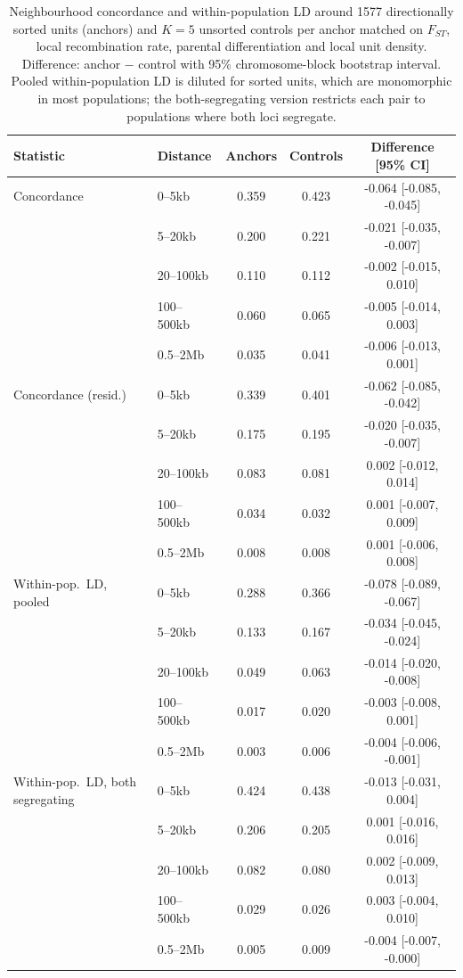 \begin{table}[htbp]
\centering
\small
\caption{Neighbourhood concordance and within-population LD around 1577 directionally sorted units (anchors) and $K=5$ unsorted controls per anchor matched on $F_{ST}$, local recombination rate, parental differentiation and local unit density. Difference: anchor $-$ control with 95\% chromosome-block bootstrap interval. Pooled within-population LD is diluted for sorted units, which are monomorphic in most populations; the both-segregating version restricts each pair to populations where both loci segregate.}
\label{tab:anchors}
\begin{tabular}{llccc}
\toprule
Statistic & Distance & Anchors & Controls & Difference [95\% CI] \\
\midrule
Concordance & 0--5kb & 0.359 & 0.423 & -0.064 [-0.085, -0.045] \\
 & 5--20kb & 0.200 & 0.221 & -0.021 [-0.035, -0.007] \\
 & 20--100kb & 0.110 & 0.112 & -0.002 [-0.015, 0.010] \\
 & 100--500kb & 0.060 & 0.065 & -0.005 [-0.014, 0.003] \\
 & 0.5--2Mb & 0.035 & 0.041 & -0.006 [-0.013, 0.001] \\
Concordance (resid.) & 0--5kb & 0.339 & 0.401 & -0.062 [-0.085, -0.042] \\
 & 5--20kb & 0.175 & 0.195 & -0.020 [-0.035, -0.007] \\
 & 20--100kb & 0.083 & 0.081 & 0.002 [-0.012, 0.014] \\
 & 100--500kb & 0.034 & 0.032 & 0.001 [-0.007, 0.009] \\
 & 0.5--2Mb & 0.008 & 0.008 & 0.001 [-0.006, 0.008] \\
Within-pop.\ LD, pooled & 0--5kb & 0.288 & 0.366 & -0.078 [-0.089, -0.067] \\
 & 5--20kb & 0.133 & 0.167 & -0.034 [-0.045, -0.024] \\
 & 20--100kb & 0.049 & 0.063 & -0.014 [-0.020, -0.008] \\
 & 100--500kb & 0.017 & 0.020 & -0.003 [-0.008, 0.001] \\
 & 0.5--2Mb & 0.003 & 0.006 & -0.004 [-0.006, -0.001] \\
Within-pop.\ LD, both segregating & 0--5kb & 0.424 & 0.438 & -0.013 [-0.031, 0.004] \\
 & 5--20kb & 0.206 & 0.205 & 0.001 [-0.016, 0.016] \\
 & 20--100kb & 0.082 & 0.080 & 0.002 [-0.009, 0.013] \\
 & 100--500kb & 0.029 & 0.026 & 0.003 [-0.004, 0.010] \\
 & 0.5--2Mb & 0.005 & 0.009 & -0.004 [-0.007, -0.000] \\
\bottomrule
\end{tabular}
\end{table}
